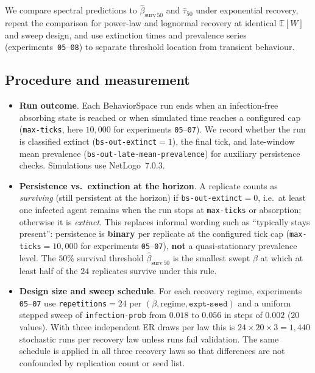 \documentclass[11pt,a4paper]{article}
\begin{document}
We compare spectral predictions to $\hat{\beta}_{\mathrm{surv}\,50}$ and $\hat{\tau}_{50}$ under exponential recovery, repeat the comparison for power-law and lognormal recovery at identical $\mathbb{E}[W]$ and sweep design, and use extinction times and prevalence series (experiments~\texttt{05}--\texttt{08}) to separate threshold location from transient behaviour.

\subsection{Procedure and measurement}

\begin{itemize}[leftmargin=*]
  \item \textbf{Run outcome}. Each BehaviorSpace run ends when an infection-free absorbing state is reached or when simulated time reaches a configured cap (\texttt{max-ticks}, here $10{,}000$ for experiments \texttt{05}--\texttt{07}). We record whether the run is classified extinct (\texttt{bs-out-extinct}${}=1$), the final tick, and late-window mean prevalence (\texttt{bs-out-late-mean-prevalence}) for auxiliary persistence checks. Simulations use NetLogo~7.0.3.

  \item \textbf{Persistence vs.\ extinction at the horizon}. A replicate counts as \emph{surviving} (still persistent at the horizon) if \texttt{bs-out-extinct}${}=0$, i.e.\ at least one infected agent remains when the run stops at \texttt{max-ticks} or absorption; otherwise it is \emph{extinct}. This replaces informal wording such as ``typically stays present'': persistence is \textbf{binary} per replicate at the configured tick cap (\texttt{max-ticks}${}=10{,}000$ for experiments \texttt{05}--\texttt{07}), \textbf{not} a quasi-stationary prevalence level. The $50\%$ survival threshold $\hat{\beta}_{\mathrm{surv}\,50}$ is the smallest swept $\beta$ at which at least half of the $24$ replicates survive under this rule.

  \item \textbf{Design size and sweep schedule}. For each recovery regime, experiments \texttt{05}--\texttt{07} use \texttt{repetitions}${}=24$ per $(\beta,\text{regime},\texttt{expt-seed})$ and a uniform stepped sweep of \texttt{infection-prob} from $0.018$ to $0.056$ in steps of $0.002$ ($20$ values). With three independent ER draws per law this is $24\times 20\times 3=1{,}440$ stochastic runs per recovery law unless runs fail validation. The same schedule is applied in all three recovery laws so that differences are not confounded by replication count or seed list.


\end{itemize}
\end{document}
